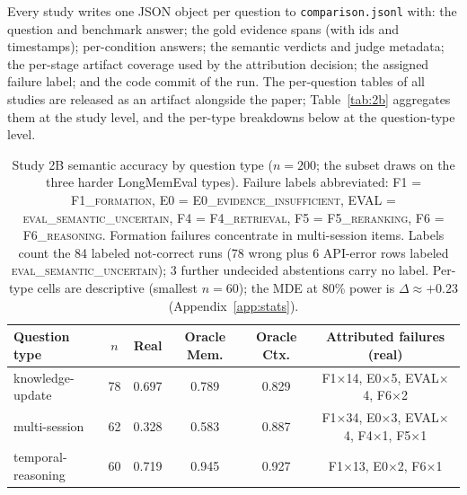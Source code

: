 \documentclass[11pt]{article}
\newcommand{\fone}{F1\textsc{\_formation}}
\newcommand{\ffour}{F4\textsc{\_retrieval}}
\newcommand{\ffive}{F5\textsc{\_reranking}}
\newcommand{\fsix}{F6\textsc{\_reasoning}}
\newcommand{\ezero}{E0\textsc{\_evidence\_insufficient}}
\newcommand{\evaluncertain}{\textsc{eval\_semantic\_uncertain}}
\begin{document}
Every study writes one JSON object per question to
\verb|comparison.jsonl| with: the question and benchmark answer; the gold
evidence spans (with ids and timestamps); per-condition answers; the
semantic verdicts and judge metadata; the per-stage artifact coverage used
by the attribution decision; the assigned failure label; and the code
commit of the run. The per-question tables of all studies are released as
an artifact alongside the paper; Table~\ref{tab:2b} aggregates them at the
study level, and the per-type breakdowns below at the question-type level.

\begin{table}[!t]
\centering\footnotesize
\setlength{\tabcolsep}{5pt}
\begin{tabular}{lccccc}
\toprule
\textbf{Question type} & $n$ & \textbf{Real} & \textbf{Oracle Mem.} & \textbf{Oracle Ctx.} & \textbf{Attributed failures (real)} \\
\midrule
knowledge-update & 78 & 0.697 & 0.789 & 0.829 & F1$\times$14, E0$\times$5, EVAL$\times$4, F6$\times$2 \\
multi-session & 62 & 0.328 & 0.583 & 0.887 & F1$\times$34, E0$\times$3, EVAL$\times$4, F4$\times$1, F5$\times$1 \\
temporal-reasoning & 60 & 0.719 & 0.945 & 0.927 & F1$\times$13, E0$\times$2, F6$\times$1 \\
\bottomrule
\end{tabular}
\caption{Study 2B semantic accuracy by question type ($n{=}200$; the subset
draws on the three harder LongMemEval types). Failure labels abbreviated:
F1 = \fone{}, E0 = \ezero{}, EVAL = \evaluncertain{}, F4 = \ffour{},
F5 = \ffive{}, F6 = \fsix{}. Formation failures concentrate in multi-session
items. Labels count the 84 labeled not-correct runs (78 wrong plus 6
API-error rows labeled \evaluncertain{}); 3 further undecided abstentions
carry no label. Per-type cells are descriptive (smallest $n{=}60$); the
MDE at 80\% power is $\Delta{\approx}+0.23$ (Appendix~\ref{app:stats}).}
\label{tab:2b-type}
\end{table}
\end{document}
